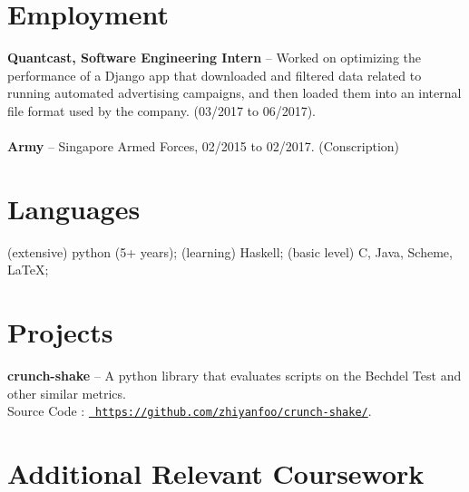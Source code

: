 \documentclass[12pt, margin]{res}
\begin{document}
 
\address{
    {\bf Github:} \href{https://github.com/zhiyanfoo}{\tt
    github.com/zhiyanfoo} \\
    {\bf Website:} \href{https://zhiyanfoo.github.io/}{\tt
    zhiyanfoo.github.io/} \\
}

\address{ 
    {\bf Email:} \href{mailto:zhiyanfoo@gmail.com}{\tt zhiyanfoo@gmail.com} \\
    {\bf Phone:} +1 519 781 2160
        }
 
\begin{resume} 
 
\section{Employment}
    {\bf Quantcast, Software Engineering Intern} -- Worked on optimizing the performance of a Django app that
    downloaded and filtered data related to running automated advertising
    campaigns, and then loaded them into an internal file format used by the
    company. (03/2017 to 06/2017). \\ \\
    {\bf Army} -- Singapore Armed Forces, 02/2015 to 02/2017. (Conscription)


\section{Languages}
    (extensive) python (5+ years); (learning) Haskell; (basic level) C, Java,
    Scheme, \LaTeX; 

\section{Projects}
    {\bf crunch-shake} -- A python library that evaluates scripts on
        the Bechdel Test and other similar metrics. \\
            Source Code : \href{https://github.com/zhiyanfoo/crunch-shake/}{\tt
            https://github.com/zhiyanfoo/crunch-shake/}.

\section{Additional Relevant Coursework} 


\end{resume}
\end{document}
